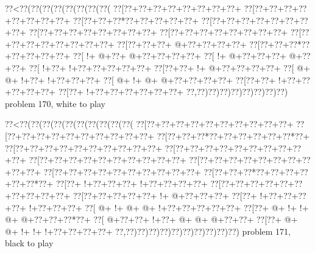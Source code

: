 \vbox{\vbox{\goo
\0??<\0??(\0??(\0??(\0??(\0??(\0??(\0??(\0??(
\0??[\0??+\0??+\0??+\0??+\0??+\0??+\0??+\0??+
\0??[\0??+\0??+\0??+\0??+\0??+\0??+\0??+\0??+
\0??[\0??+\0??+\0??*\0??+\0??+\0??+\0??+\0??+
\0??[\0??+\0??+\0??+\0??+\0??+\0??+\0??+\0??+
\0??[\0??+\0??+\0??+\0??+\0??+\0??+\0??+\0??+
\0??[\0??+\0??+\0??+\0??+\0??+\0??+\0??+\0??+
\0??[\0??+\0??+\0??+\0??+\0??+\0??+\0??+\0??+
\0??[\0??+\0??+\0??+\- @+\0??+\0??+\0??+\0??+
\0??[\0??+\0??+\0??*\0??+\0??+\0??+\0??+\0??+
\0??[\- !+\- @+\0??+\- @+\0??+\0??+\0??+\0??+
\0??[\- !+\- @+\0??+\0??+\0??+\- @+\0??+\0??+
\0??[\- !+\0??+\- !+\0??+\0??+\0??+\0??+\0??+
\0??[\0??+\0??+\- !+\- @+\0??+\0??+\0??+\0??+
\0??[\- @+\- @+\- !+\0??+\- !+\0??+\0??+\0??+
\0??[\- @+\- !+\- @+\- @+\0??+\0??+\0??+\0??+
\0??[\0??+\0??+\- !+\0??+\0??+\0??+\0??+\0??+
\0??[\0??+\- !+\0??+\0??+\0??+\0??+\0??+\0??+
\0??,\0??)\0??)\0??)\0??)\0??)\0??)\0??)\0??)
}
\hfil problem 170, white to play\hfil\break
}

\vbox{\vbox{\goo
\0??<\0??(\0??(\0??(\0??(\0??(\0??(\0??(\0??(\0??(\0??(
\0??[\0??+\0??+\0??+\0??+\0??+\0??+\0??+\0??+\0??+\0??+
\0??[\0??+\0??+\0??+\0??+\0??+\0??+\0??+\0??+\0??+\0??+
\0??[\0??+\0??+\0??*\0??+\0??+\0??+\0??+\0??+\0??*\0??+
\0??[\0??+\0??+\0??+\0??+\0??+\0??+\0??+\0??+\0??+\0??+
\0??[\0??+\0??+\0??+\0??+\0??+\0??+\0??+\0??+\0??+\0??+
\0??[\0??+\0??+\0??+\0??+\0??+\0??+\0??+\0??+\0??+\0??+
\0??[\0??+\0??+\0??+\0??+\0??+\0??+\0??+\0??+\0??+\0??+
\0??[\0??+\0??+\0??+\0??+\0??+\0??+\0??+\0??+\0??+\0??+
\0??[\0??+\0??+\0??*\0??+\0??+\0??+\0??+\0??+\0??*\0??+
\0??[\0??+\- !+\0??+\0??+\0??+\- !+\0??+\0??+\0??+\0??+
\0??[\0??+\0??+\0??+\0??+\0??+\0??+\0??+\0??+\0??+\0??+
\0??[\0??+\0??+\0??+\0??+\0??+\- !+\- @+\0??+\0??+\0??+
\0??[\0??+\- !+\0??+\0??+\0??+\0??+\- !+\0??+\0??+\0??+
\0??[\- @+\- !+\- @+\- @+\- !+\0??+\0??+\0??+\0??+\0??+
\0??[\0??+\- @+\- !+\- !+\- @+\- @+\0??+\0??+\0??*\0??+
\0??[\- @+\0??+\0??+\- !+\0??+\- @+\- @+\- @+\0??+\0??+
\0??[\0??+\- @+\- @+\- !+\- !+\- !+\0??+\0??+\0??+\0??+
\0??,\0??)\0??)\0??)\0??)\0??)\0??)\0??)\0??)\0??)\0??)
}
\hfil problem 171, black to play\hfil\break
}

